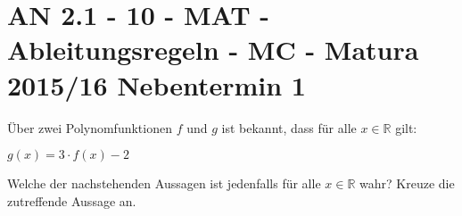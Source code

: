 \section{AN 2.1 - 10 - MAT - Ableitungsregeln - MC - Matura 2015/16 Nebentermin 1}

\begin{beispiel}[AN 2.1]{1} %
Über zwei Polynomfunktionen $f$ und $g$ ist bekannt, dass für alle $x\in \mathbb{R}$ gilt: 

$g(x)=3\cdot f(x)-2$ \leer

Welche der nachstehenden Aussagen ist jedenfalls für alle $x\in \mathbb{R}$ wahr? Kreuze die zutreffende Aussage an. 

\end{beispiel}